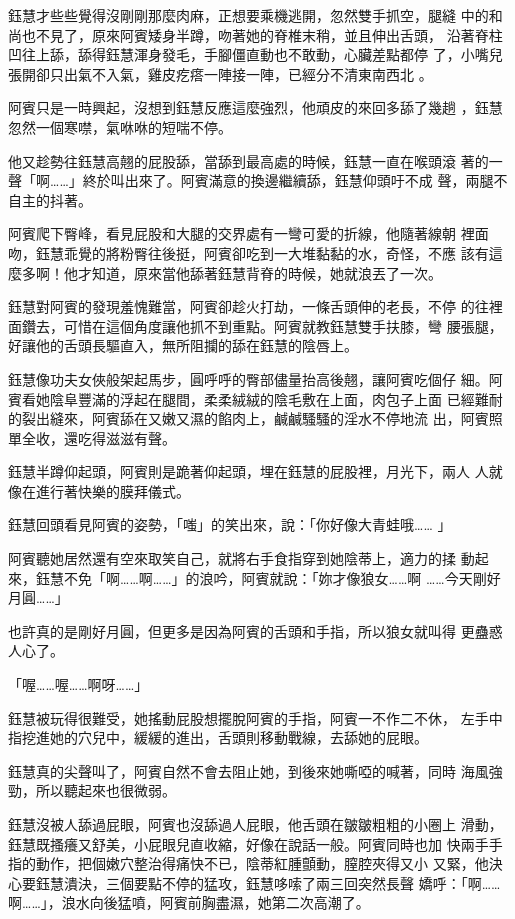 鈺慧才些些覺得沒剛剛那麼肉麻，正想要乘機逃開，忽然雙手抓空，腿縫
中的和尚也不見了，原來阿賓矮身半蹲，吻著她的脊椎末稍，並且伸出舌頭，
沿著脊柱凹往上舔，舔得鈺慧渾身發毛，手腳僵直動也不敢動，心臟差點都停
了，小嘴兒張開卻只出氣不入氣，雞皮疙瘩一陣接一陣，已經分不清東南西北
。

阿賓只是一時興起，沒想到鈺慧反應這麼強烈，他頑皮的來回多舔了幾趟
，鈺慧忽然一個寒噤，氣咻咻的短喘不停。

他又趁勢往鈺慧高翹的屁股舔，當舔到最高處的時候，鈺慧一直在喉頭滾
著的一聲「啊……」終於叫出來了。阿賓滿意的換邊繼續舔，鈺慧仰頭吁不成
聲，兩腿不自主的抖著。

阿賓爬下臀峰，看見屁股和大腿的交界處有一彎可愛的折線，他隨著線朝
裡面吻，鈺慧乖覺的將粉臀往後挺，阿賓卻吃到一大堆黏黏的水，奇怪，不應
該有這麼多啊！他才知道，原來當他舔著鈺慧背脊的時候，她就浪丟了一次。

鈺慧對阿賓的發現羞愧難當，阿賓卻趁火打劫，一條舌頭伸的老長，不停
的往裡面鑽去，可惜在這個角度讓他抓不到重點。阿賓就教鈺慧雙手扶膝，彎
腰張腿，好讓他的舌頭長驅直入，無所阻攔的舔在鈺慧的陰唇上。

鈺慧像功夫女俠般架起馬步，圓呼呼的臀部儘量抬高後翹，讓阿賓吃個仔
細。阿賓看她陰阜豐滿的浮起在腿間，柔柔絨絨的陰毛敷在上面，肉包子上面
已經難耐的裂出縫來，阿賓舔在又嫩又濕的餡肉上，鹹鹹騷騷的淫水不停地流
出，阿賓照單全收，還吃得滋滋有聲。

鈺慧半蹲仰起頭，阿賓則是跪著仰起頭，埋在鈺慧的屁股裡，月光下，兩人
人就像在進行著快樂的膜拜儀式。

鈺慧回頭看見阿賓的姿勢，「嗤」的笑出來，說：「你好像大青蛙哦……
」

阿賓聽她居然還有空來取笑自己，就將右手食指穿到她陰蒂上，適力的揉
動起來，鈺慧不免「啊……啊……」的浪吟，阿賓就說：「妳才像狼女……啊
……今天剛好月圓……」

也許真的是剛好月圓，但更多是因為阿賓的舌頭和手指，所以狼女就叫得
更蠱惑人心了。

「喔……喔……啊呀……」

鈺慧被玩得很難受，她搖動屁股想擺脫阿賓的手指，阿賓一不作二不休，
左手中指挖進她的穴兒中，緩緩的進出，舌頭則移動戰線，去舔她的屁眼。

鈺慧真的尖聲叫了，阿賓自然不會去阻止她，到後來她嘶啞的喊著，同時
海風強勁，所以聽起來也很微弱。

鈺慧沒被人舔過屁眼，阿賓也沒舔過人屁眼，他舌頭在皺皺粗粗的小圈上
滑動，鈺慧既搔癢又舒美，小屁眼兒直收縮，好像在說話一般。阿賓同時也加
快兩手手指的動作，把個嫩穴整治得痛快不已，陰蒂紅腫顫動，膣腔夾得又小
又緊，他決心要鈺慧潰決，三個要點不停的猛攻，鈺慧哆嗦了兩三回突然長聲
嬌呼：「啊……啊……」，浪水向後猛噴，阿賓前胸盡濕，她第二次高潮了。

